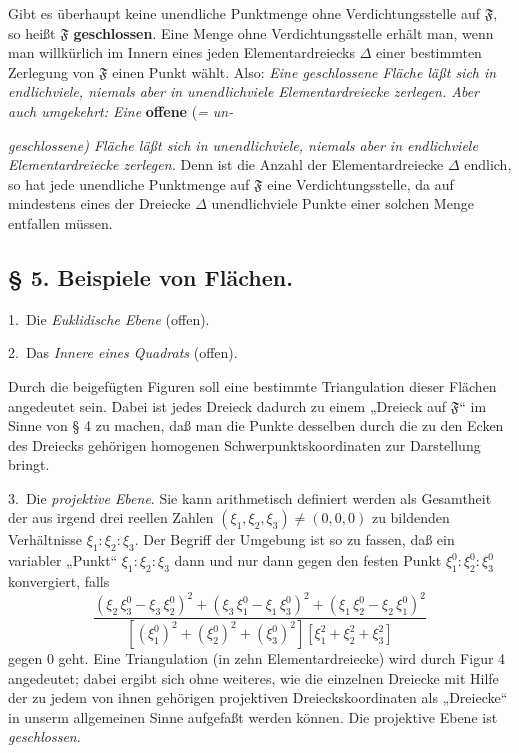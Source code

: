 \documentclass{article}
\begin{document}
Gibt es überhaupt keine unendliche Punktmenge ohne Verdichtungsstelle auf $\mathfrak{F}$, so heißt $\mathfrak{F}$ \textbf{geschlossen}. Eine Menge ohne Verdichtungsstelle erhält man, wenn man willkürlich im Innern eines jeden Elementardreiecks $\Delta$ einer bestimmten Zerlegung von $\mathfrak{F}$ einen Punkt wählt. Also: \emph{Eine geschlossene Fläche läßt sich in endlichviele, niemals aber in unendlichviele Elementardreiecke zerlegen. Aber auch umgekehrt: Eine} \textbf{offene} (\emph{= un-}

\emph{geschlossene) Fläche läßt sich in unendlichviele, niemals aber in endlichviele Elementardreiecke zerlegen.} Denn ist die Anzahl der Elementardreiecke $\Delta$ endlich, so hat jede unendliche Punktmenge auf $\mathfrak{F}$ eine Verdichtungsstelle, da auf mindestens eines der Dreiecke $\Delta$ unendlichviele Punkte einer solchen Menge entfallen müssen.

\subsection*{§ 5. Beispiele von Flächen.}

1.\ Die \emph{Euklidische Ebene} (offen).

2.\ Das \emph{Innere eines Quadrats} (offen).


Durch die beigefügten Figuren soll eine bestimmte Triangulation dieser Flächen angedeutet sein. Dabei ist jedes Dreieck dadurch zu einem „Dreieck auf $\mathfrak{F}$“ im Sinne von § 4 zu machen, daß man die Punkte desselben durch die zu den Ecken des Dreiecks gehörigen homogenen Schwerpunktskoordinaten zur Darstellung bringt.

3.\ Die \emph{projektive Ebene}. Sie kann arithmetisch definiert werden als Gesamtheit der aus irgend drei reellen Zahlen $(\xi_1, \xi_2, \xi_3) \ne (0, 0, 0)$ zu bildenden Verhältnisse $\xi_1 : \xi_2 : \xi_3$. Der Begriff der Umgebung ist so zu fassen, daß ein variabler „Punkt“ $\xi_1 : \xi_2 : \xi_3$ dann und nur dann gegen den festen Punkt $\xi_1^0 : \xi_2^0 : \xi_3^0$ konvergiert, falls
\[
\frac{(\xi_2\,\xi_3^0 - \xi_3\,\xi_2^0)^2 + (\xi_3\,\xi_1^0 - \xi_1\,\xi_3^0)^2 + (\xi_1\,\xi_2^0 - \xi_2\,\xi_1^0)^2}{[(\xi_1^0)^2 + (\xi_2^0)^2 + (\xi_3^0)^2] [\xi_1^2 + \xi_2^2 + \xi_3^2]}
\]
gegen 0 geht. Eine Triangulation (in zehn Elementardreiecke) wird durch Figur 4 angedeutet; dabei ergibt sich ohne weiteres, wie die einzelnen Dreiecke mit Hilfe der zu jedem von ihnen gehörigen projektiven Dreieckskoordinaten als „Dreiecke“ in unserm allgemeinen Sinne aufgefaßt werden können. Die projektive Ebene ist \emph{geschlossen}.
\end{document}
